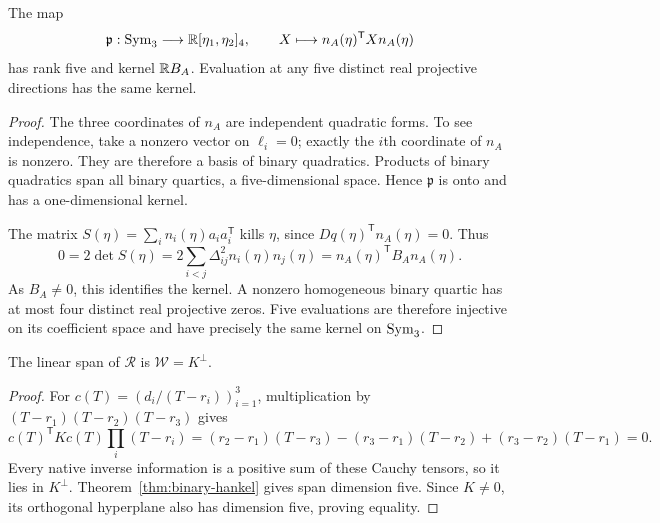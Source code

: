 \begin{lemma}\label{lem:conormal-kernel}
The map
\[
 \mathfrak p:\operatorname{Sym}_3\longrightarrow\mathbb R[\eta_1,\eta_2]_4,
 \qquad X\longmapsto n_A(\eta)^{\mathsf T}Xn_A(\eta)
\]
has rank five and kernel $\mathbb R B_A$. Evaluation at any five distinct real projective directions has the same kernel.
\end{lemma}
\begin{proof}
The three coordinates of $n_A$ are independent quadratic forms. To see independence, take a nonzero vector on $\ell_i=0$; exactly the $i$th coordinate of $n_A$ is nonzero. They are therefore a basis of binary quadratics. Products of binary quadratics span all binary quartics, a five-dimensional space. Hence $\mathfrak p$ is onto and has a one-dimensional kernel.

The matrix $S(\eta)=\sum_i n_i(\eta)a_i a_i^{\mathsf T}$ kills $\eta$, since $Dq(\eta)^{\mathsf T}n_A(\eta)=0$. Thus
\[
 0=2\det S(\eta)=2\sum_{i<j}\Delta_{ij}^2n_i(\eta)n_j(\eta)
 =n_A(\eta)^{\mathsf T}B_A n_A(\eta).
\]
As $B_A\ne0$, this identifies the kernel. A nonzero homogeneous binary quartic has at most four distinct real projective zeros. Five evaluations are therefore injective on its coefficient space and have precisely the same kernel on $\operatorname{Sym}_3$.
\end{proof}

\begin{lemma}\label{lem:native-annihilator}
The linear span of $\mathscr R$ is $\mathscr W=K^\perp$.
\end{lemma}
\begin{proof}
For $c(T)=(d_i/(T-r_i))_{i=1}^3$, multiplication by
$(T-r_1)(T-r_2)(T-r_3)$ gives
\[
 c(T)^{\mathsf T}Kc(T)\prod_i(T-r_i)
 =(r_2-r_1)(T-r_3)-(r_3-r_1)(T-r_2)+(r_3-r_2)(T-r_1)=0.
\]
Every native inverse information is a positive sum of these Cauchy tensors, so it lies in $K^\perp$. Theorem~\ref{thm:binary-hankel} gives span dimension five. Since $K\ne0$, its orthogonal hyperplane also has dimension five, proving equality.
\end{proof}

